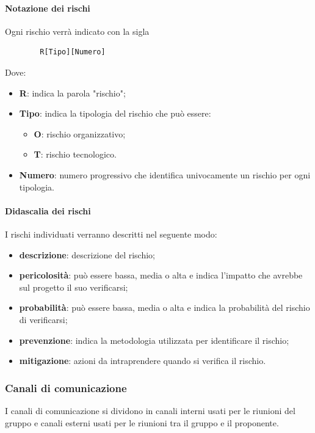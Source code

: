 \paragraph{Notazione dei rischi}
Ogni rischio verrà indicato con la sigla
\begin{lstlisting}
        R[Tipo][Numero]
\end{lstlisting}
Dove:
\begin{itemize}
    \item \textbf{R}: indica la parola "rischio";
    \item \textbf{Tipo}: indica la tipologia del rischio che può essere:
    \begin{itemize}
        \item \textbf{O}: rischio organizzativo;
        \item \textbf{T}: rischio tecnologico.
    \end{itemize} 
    \item \textbf{Numero}: numero progressivo che identifica univocamente un rischio per ogni tipologia.
\end{itemize}

\paragraph{Didascalia dei rischi}
I rischi individuati verranno descritti nel seguente modo:
\begin{itemize}
    \item \textbf{descrizione}: descrizione del rischio;
    \item \textbf{pericolosità}: può essere bassa, media o alta e indica l'impatto che avrebbe sul progetto il suo verificarsi;
    \item \textbf{probabilità}: può essere bassa, media o alta e indica la probabilità del rischio di verificarsi;
    \item \textbf{prevenzione}: indica la metodologia utilizzata per identificare il rischio;
    \item \textbf{mitigazione}: azioni da intraprendere quando si verifica il rischio.   
\end{itemize}

\subsubsection{Canali di comunicazione}
I canali di comunicazione si dividono in canali interni usati per le riunioni del gruppo e canali esterni usati per le riunioni tra il gruppo e il proponente.

